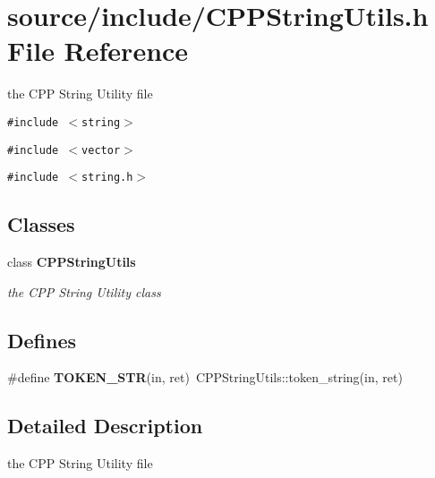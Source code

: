 \section{source/include/CPPStringUtils.h File Reference}
\label{CPPStringUtils_8h}
the CPP String Utility file 

{\tt \#include $<$string$>$}\par
{\tt \#include $<$vector$>$}\par
{\tt \#include $<$string.h$>$}\par
\subsection*{Classes}
\begin{CompactItemize}
\item 
class {\bf CPPStringUtils}
\begin{CompactList}\small\item\em the CPP String Utility class \item\end{CompactList}\end{CompactItemize}
\subsection*{Defines}
\begin{CompactItemize}
\item 
\#define \textbf{TOKEN\_\-STR}(in, ret)~CPPStringUtils::token\_\-string(in, ret)\label{CPPStringUtils_8h_0c4bf3840f8463665e3d39163a903a37}

\end{CompactItemize}


\subsection{Detailed Description}
the CPP String Utility file 

